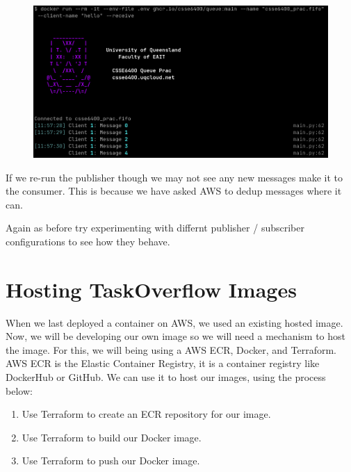 \documentclass{csse4400}
\begin{document}
\begin{figure}[H]
  \includegraphics[width=\textwidth]{images/fifosub}
\end{figure}

If we re-run the publisher though we may not see any new messages make it to the consumer. This is because we have asked AWS to dedup messages where it can.


Again as before try experimenting with differnt publisher / subscriber configurations to see how they behave.



\section{Hosting TaskOverflow Images}

When we last deployed a container on AWS,
we used an existing hosted image.
Now, we will be developing our own image so we will need a mechanism to host the image.
For this, we will being using a AWS ECR, Docker, and Terraform.
AWS ECR is the Elastic Container Registry,
it is a container registry like DockerHub or GitHub.
We can use it to host our images,
using the process below:

\begin{enumerate}
    \item Use Terraform to create an ECR repository for our image.
    \item Use Terraform to build our Docker image.
    \item Use Terraform to push our Docker image.
\end{enumerate}
\end{document}
